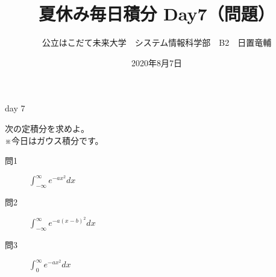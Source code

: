 \documentclass[dvipdfmx,uplatex]{jsarticle}
\title{夏休み毎日積分 Day7（問題）}
\author{公立はこだて未来大学　システム情報科学部　B2　日置竜輔}
\date{2020年8月7日}
\begin{document}
\maketitle

\begin{itembox}[c]{day 7}
    \begin{center}
        次の定積分を求めよ。\\
        ※今日はガウス積分です。
    \end{center}
\end{itembox}

\begin{description}
    \item [問1] $\displaystyle \int_{-\infty}^{\infty} e^{-ax^2} dx$
\end{description}

\begin{description}
    \item [問2] $\displaystyle \int_{-\infty}^{\infty} e^{-a(x-b)^2} dx$
\end{description}

\begin{description}
    \item [問3] $\displaystyle \int_0^{\infty} e^{-ax^2} dx$
\end{description}
\end{document}
